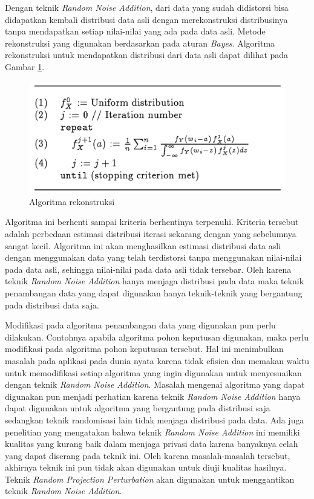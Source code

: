 \documentclass[a4paper,twoside]{article}
\begin{document}
\begin{enumerate}
		Dengan teknik \textit{Random Noise Addition}, dari data yang sudah didistorsi bisa didapatkan kembali distribusi data asli dengan merekonstruksi distribusinya tanpa mendapatkan setiap nilai-nilai yang ada pada data asli. Metode rekonstruksi yang digunakan berdasarkan pada aturan \textit{Bayes}. Algoritma rekonstruksi untuk mendapatkan distribusi dari data asli dapat dilihat pada Gambar \ref{fig:rnaalgorithm}.
		
		\begin{figure}
			\centering
			\includegraphics[scale=0.4]{rnaalgorithm}
			\caption{Algoritma rekonstruksi}
			\label{fig:rnaalgorithm}
		\end{figure}

		Algoritma ini berhenti sampai kriteria berhentinya terpenuhi. Kriteria tersebut adalah perbedaan estimasi distribusi iterasi sekarang dengan yang sebelumnya sangat kecil. Algoritma ini akan menghasilkan estimasi distribusi data asli dengan menggunakan data yang telah terdistorsi tanpa menggunakan nilai-nilai pada data asli, sehingga nilai-nilai pada data asli tidak tersebar. Oleh karena teknik \textit{Random Noise Addition} hanya menjaga distribusi pada data maka teknik penambangan data yang dapat digunakan hanya teknik-teknik yang bergantung pada distribusi data saja.

		Modifikasi pada algoritma penambangan data yang digunakan pun perlu dilakukan. Contohnya apabila algoritma pohon keputusan digunakan, maka perlu modifikasi pada algoritma pohon keputusan tersebut. Hal ini menimbulkan masalah pada aplikasi pada dunia nyata karena tidak efisien dan memakan waktu untuk memodifikasi setiap algoritma yang ingin digunakan untuk menyesuaikan dengan teknik \textit{Random Noise Addition}. Masalah mengenai algoritma yang dapat digunakan pun menjadi perhatian karena teknik \textit{Random Noise Addition} hanya dapat digunakan untuk algoritma yang bergantung pada distribusi saja sedangkan teknik randomisasi lain tidak menjaga distribusi pada data. Ada juga penelitian yang mengatakan bahwa teknik \textit{Random Noise Addition} ini memiliki kualitas yang kurang baik dalam menjaga privasi data karena banyaknya celah yang dapat diserang pada teknik ini. Oleh karena masalah-masalah tersebut, akhirnya teknik ini pun tidak akan digunakan untuk diuji kualitas hasilnya. Teknik \textit{Random Projection Perturbation} akan digunakan untuk menggantikan teknik \textit{Random Noise Addition}.


\end{enumerate}
\end{document}
